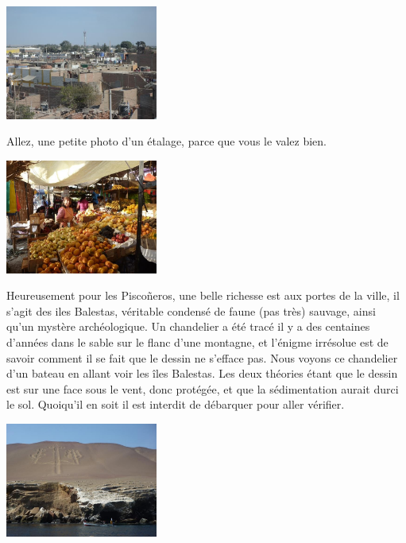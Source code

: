 \begin{multicols}{2}
\smallbreak
\hspace*{-0.65cm}
\includegraphics[width=5cm]{articles/Cote-du-sud/12559974777RC0.jpg}
\smallbreak

Allez, une petite photo d'un étalage, parce que vous le valez bien.

\smallbreak
\hspace*{-0.65cm}
\includegraphics[width=5cm]{articles/Cote-du-sud/1255997490cIfD.jpg}
\smallbreak

Heureusement pour les Piscoñeros, une belle richesse est aux portes de la ville, il s'agit des iles Balestas, véritable condensé de faune (pas très) sauvage, ainsi qu'un mystère archéologique. Un chandelier a été tracé il y a des centaines d'années dans le sable sur le flanc d'une montagne, et l'énigme irrésolue est de savoir comment il se fait que le dessin ne s'efface pas. Nous voyons ce chandelier d'un bateau en allant voir les îles Balestas. Les deux théories étant que le dessin est sur une face sous le vent, donc protégée, et que la sédimentation aurait durci le sol. Quoiqu'il en soit il est interdit de débarquer pour aller vérifier.

\smallbreak
\hspace*{-0.65cm}
\includegraphics[width=5cm]{articles/Cote-du-sud/1255997496rIn7.jpg}
\smallbreak


\end{multicols}
